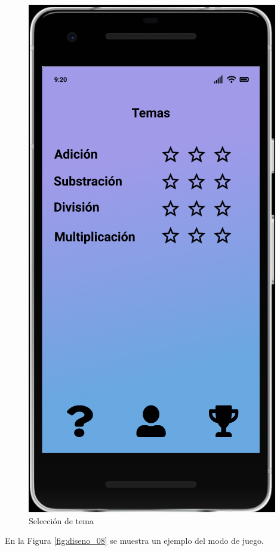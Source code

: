 \documentclass{article}
\begin{document}
\begin{figure}[H]
    \centering
    \includegraphics[scale=0.8]{imgs/Figma/Temas}
    \caption{Selección de tema}
    \label{fig:diseno_07}
\end{figure}

En la Figura \ref{fig:diseno_08} se muestra un ejemplo del modo de juego.
\end{document}
